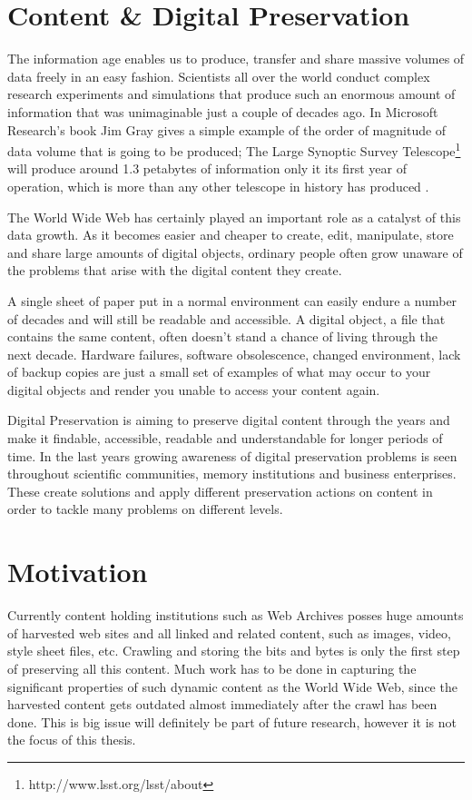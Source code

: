 \section{Content \& Digital Preservation}
The information age enables us to produce, transfer and share massive volumes of data freely in an easy fashion. Scientists all over the world conduct complex research experiments and simulations that produce such an enormous amount of information that was unimaginable just a couple of decades ago. In Microsoft Research's book Jim Gray gives a simple example of the order of magnitude of data volume that is going to be produced; The Large Synoptic Survey Telescope\footnote{http://www.lsst.org/lsst/about} will produce around 1.3 petabytes of information only it its first year of operation, which is more than any other telescope in history has produced \cite{Gray:2009:fourthparadigm}.

The World Wide Web has certainly played an important role as a catalyst of this data growth.
As it becomes easier and cheaper to create, edit, manipulate, store and share large amounts of digital objects, ordinary people often grow unaware of the problems that arise with the digital content they create.

A single sheet of paper put in a normal environment can easily endure a number of decades and will still be readable and accessible. A digital object, a file that contains the same content, often doesn't stand a chance of living through the next decade. Hardware failures, software obsolescence, changed environment, lack of backup copies are just a small set of examples of what may occur to your digital objects and render you unable to access your content again.

Digital Preservation is aiming to preserve digital content through the years and make it findable, accessible, readable and understandable for longer periods of time. In the last years growing awareness of digital preservation problems is seen throughout scientific communities, memory institutions and business enterprises. These create solutions and apply different preservation actions on content in order to tackle many problems on different levels.

\section{Motivation}
Currently content holding institutions such as Web Archives posses huge amounts of harvested web sites and all linked and related content, such as images, video, style sheet files, etc. Crawling and storing the bits and bytes is only the first step of preserving all this content. Much work has to be done in capturing the significant properties of such dynamic content as the World Wide Web, since the harvested content gets outdated almost immediately after the crawl has been done. This is big issue will definitely be part of future research, however it is not the focus of this thesis.

